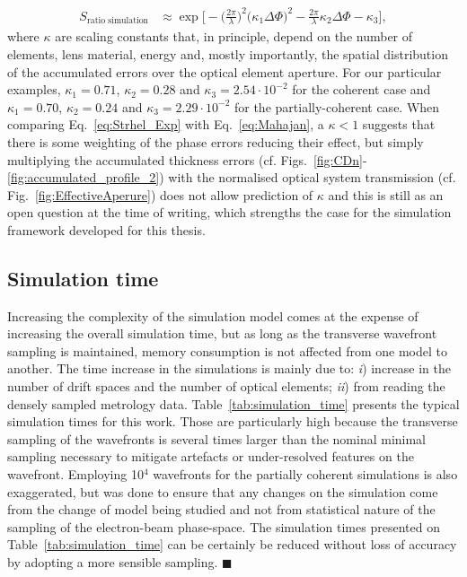 \begin{refsection}
\begin{align}\label{eq:Strhel_Exp}
    S_{\text{ratio simulation}}&\approx\exp{\bigg[- \bigg(\frac{2\pi}{\lambda}\bigg)^2\big(\kappa_1\Delta\Phi\big)^2-\frac{2\pi}{\lambda}\kappa_2\Delta\Phi-\kappa_3\bigg]},
\end{align}
where $\kappa$ are scaling constants that, in principle, depend on the number of elements, lens material, energy and, mostly importantly, the spatial distribution of the accumulated errors over the optical element aperture. For our particular examples, $\kappa_1=0.71$, $\kappa_2=0.28$ and $\kappa_3=2.54\cdot10^{-2}$ for the coherent case and $\kappa_1=0.70$, $\kappa_2=0.24$ and $\kappa_3=2.29\cdot10^{-2}$ for the partially-coherent case. When comparing Eq.~\ref{eq:Strhel_Exp} with Eq.~\ref{eq:Mahajan}, a $\kappa<1$ suggests that there is some weighting of the phase errors reducing their effect, but simply multiplying the accumulated thickness errors (cf. Figs.~\ref{fig:CDn}-\ref{fig:accumulated_profile_2}) with the normalised optical system transmission (cf. Fig.~\ref{fig:EffectiveAperure}) does not allow prediction of $\kappa$ and this is still as an open question at the time of writing, which strengths the case for the simulation framework developed for this thesis.

\subsection{Simulation time}\label{section:discussion_time}

Increasing the complexity of the simulation model comes at the expense of increasing the overall simulation time, but as long as the transverse wavefront sampling is maintained, memory consumption is not affected from one model to another. The time increase in the simulations is mainly due to: \textit{i}) increase in the number of drift spaces and the number of optical elements; \textit{ii}) from reading the densely sampled metrology data. Table~\ref{tab:simulation_time} presents the typical simulation times for this work. Those are particularly high because the transverse sampling of the wavefronts is several times larger than the nominal minimal sampling necessary to mitigate artefacts or under-resolved features on the wavefront. Employing 10$^{4}$ wavefronts for the partially coherent simulations is also exaggerated, but was done to ensure that any changes on the simulation come from the change of model being studied and not from statistical nature of the sampling of the electron-beam phase-space. The simulation times presented on Table~\ref{tab:simulation_time} can be certainly be reduced without loss of accuracy by adopting a more sensible sampling. $\blacksquare$


\end{refsection}
